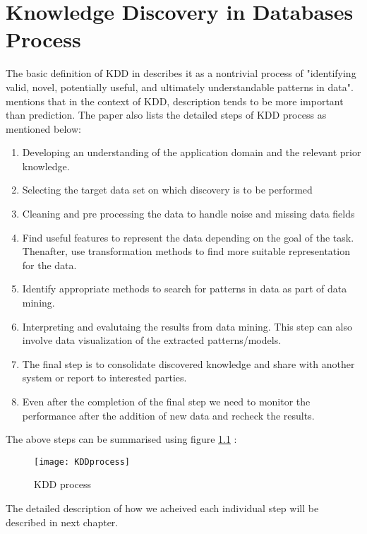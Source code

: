 %
%
%
%

\chapter{Knowledge Discovery in Databases Process}

The basic definition of KDD in \autocite{Fayyad:1996} describes it as a nontrivial process of "identifying valid, novel, potentially
useful, and ultimately understandable patterns in data". \autocite{Fayyad:1996} mentions that in the context of KDD, description tends to be more important than prediction. The paper also lists the detailed steps of KDD process as mentioned below:

\begin{enumerate}
	\item Developing an understanding of the application domain and the relevant prior knowledge.
	\item Selecting the target data set on which discovery is to be performed
	\item Cleaning and pre processing the data to handle noise and missing data fields
	\item Find useful features to represent the  data depending on the goal of
	the task. Thenafter, use transformation methods to find more suitable representation for the data.
	\item Identify appropriate methods to search for patterns in data as part of data mining.
	\item Interpreting and evalutaing the results from data mining. This step
	can also involve data visualization of the extracted patterns/models.
	\item The final step is to consolidate discovered knowledge and share with another system or report to interested parties.
	\item Even after the completion of the final step we need to monitor the performance after the addition of new data and recheck the results.
\end{enumerate}

The above steps can be summarised using figure \ref{fig:KDDprocess}  : 

\begin{figure}  [H]
	\begin{center}
		\texttt{[image: KDDprocess]}
		\caption{KDD process} \label{fig:KDDprocess}
	\end{center}
\end{figure}

The detailed description of how we acheived each individual step will be described in next chapter.

